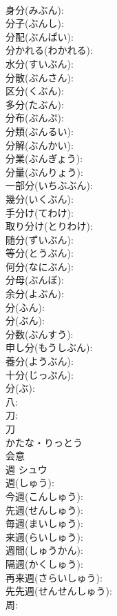 \documentclass[8pt]{extreport}
\begin{document}
\begin{CJK}{UTF8}{min}
\\	身分(みぶん): 
\\	分子(ぶんし): 
\\	分配(ぶんぱい): 
\\	分かれる(わかれる): 
\\	水分(すいぶん): 
\\	分散(ぶんさん): 
\\	区分(くぶん): 
\\	多分(たぶん): 
\\	分布(ぶんぷ): 
\\	分類(ぶんるい): 
\\	分解(ぶんかい): 
\\	分業(ぶんぎょう): 
\\	分量(ぶんりょう): 
\\	一部分(いちぶぶん): 
\\	幾分(いくぶん): 
\\	手分け(てわけ): 
\\	取り分け(とりわけ): 
\\	随分(ずいぶん): 
\\	等分(とうぶん): 
\\	何分(なにぶん): 
\\	分母(ぶんぼ): 
\\	余分(よぶん): 
\\	分(ふん): 
\\	分(ぶん): 
\\	分数(ぶんすう): 
\\	申し分(もうしぶん): 
\\	養分(ようぶん): 
\\	十分(じっぷん): 
\\	分(ぶ): 
\\	八: 
\\	刀: 
\\	刀	
\\	かたな・りっとう	
\\	会意 
\\	週	シュウ			
\\	週(しゅう): 
\\	今週(こんしゅう): 
\\	先週(せんしゅう): 
\\	毎週(まいしゅう): 
\\	来週(らいしゅう): 
\\	週間(しゅうかん): 
\\	隔週(かくしゅう): 
\\	再来週(さらいしゅう): 
\\	先先週(せんせんしゅう): 
\\	周: 

\end{CJK}
\end{document}
